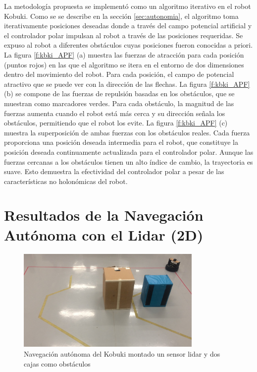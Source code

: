 La metodología propuesta se implementó como un algoritmo iterativo en el robot Kobuki. 
Como se se describe en la sección \ref{sec:autonomia}, el algoritmo toma iterativamente 
posiciones deseadas  donde a través del campo potencial artificial y el controlador 
polar impulsan al robot a través de las posiciones requeridas. Se expuso al robot 
a diferentes obstáculos cuyas posiciones fueron conocidas a priori. La figura 
\ref{f:kbki_APF} (a) muestra las fuerzas de atracción para cada posición (puntos rojos) en 
las que el algoritmo se itera en el entorno de dos dimensiones dentro del movimiento del 
robot. Para cada posición, el campo de potencial atractivo que se puede ver con la dirección 
de las flechas. La figura \ref{f:kbki_APF} (b) se compone de las fuerzas de repulsión basadas en 
los obstáculos, que se muestran como marcadores verdes. Para cada obstáculo, la magnitud de 
las fuerzas aumenta cuando el robot está más cerca y su dirección señala los obstáculos, permitiendo 
que el robot los evite. La figura \ref{f:kbki_APF} (c) muestra la superposición de ambas fuerzas 
con los obstáculos reales. Cada fuerza proporciona una posición deseada intermedia para el 
robot, que constituye la posición deseada continuamente actualizada para el controlador 
polar. Aunque las fuerzas cercanas a los obstáculos tienen un alto índice de cambio, la 
trayectoria es suave. Esto demuestra la efectividad del controlador polar a pesar de las 
características no holonómicas del robot.

\section{Resultados de la Navegación Autónoma con el Lidar (2D)}
\begin{figure}%
  \centering \footnotesize
  \includegraphics[width=0.80\textwidth]{images/kobuki_201.jpg}
  \captionsetup{font=footnotesize}
  \caption{Navegación autónoma del Kobuki montado un sensor lidar y dos cajas
  como obstáculos}
\end{figure}

